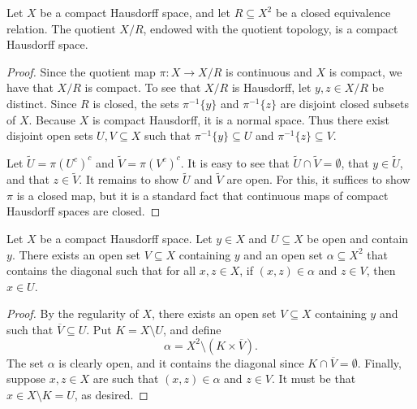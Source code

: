 \begin{lemma}
\label{lemma_quotient_is_compact_hausdorff}
    Let $X$ be a compact Hausdorff space, and let $R \subseteq X^2$ be a closed equivalence relation.  The quotient $X/R$, endowed with the quotient topology, is a compact Hausdorff space.
\end{lemma}

\begin{proof}
    Since the quotient map $\pi : X \to X/R$ is continuous and $X$ is compact, we have that $X/R$ is compact.  To see that $X/R$ is Hausdorff, let $y, z \in X/R$ be distinct. Since $R$ is closed, the sets $\pi^{-1}\{y\}$ and $\pi^{-1}\{z\}$ are disjoint closed subsets of $X$.
    Because $X$ is compact Hausdorff, it is a normal space. Thus there exist disjoint open sets $U, V \subseteq X$ such that $\pi^{-1}\{y\} \subseteq U$ and $\pi^{-1}\{z\} \subseteq V$.

    Let $\widetilde{U} = \pi(U^c)^c$ and $\widetilde{V} = \pi(V^c)^c$. It is easy to see that $\widetilde{U} \cap \widetilde{V} = \emptyset$, that $y \in \widetilde{U}$, and that $z \in \widetilde{V}$. It remains to show $\widetilde{U}$ and $\widetilde{V}$ are open. For this, it suffices to show $\pi$ is a closed map, but it is a standard fact that continuous maps of compact Hausdorff spaces are closed.
\end{proof}

\begin{lemma}
\label{lemma_uniform_near_diag}
\leanok{}
Let $X$ be a compact Hausdorff space.  Let $y \in X$ and $U \subseteq X$ be open and contain $y$.  There exists an open set $V \subseteq X$ containing $y$ and an open set $\alpha \subseteq X^2$ that contains the diagonal such that for all $x, z \in X$, if $(x,z) \in \alpha$ and $z \in V$, then $x \in U$.    
\end{lemma}

\begin{proof}
    By the regularity of $X$, there exists an open set $V \subseteq X$ containing $y$ and such that $\overline{V} \subseteq U$.  Put $K = X \setminus U$, and define
    \[\alpha = X^2 \setminus (K \times \overline{V}).\]
    The set $\alpha$ is clearly open, and it contains the diagonal since $K \cap \overline{V} = \emptyset$.  Finally, suppose $x, z \in X$ are such that $(x,z) \in \alpha$ and $z \in V$.  It must be that $x \in X \setminus K = U$, as desired.
\end{proof}

